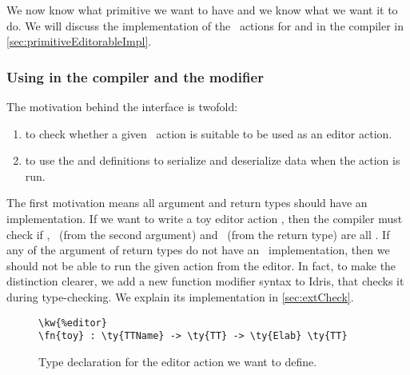 We now know what primitive we want to have and we know what we want it to do.
We will discuss the implementation of the \Elab\ actions for 
and  in the compiler in \autoref{sec:primitiveEditorableImpl}.

\subsubsection{Using  in the compiler and the  modifier}\label{ssec:usingEditorable}

The motivation behind the  interface is twofold:
\begin{enumerate}
\item to check whether a given \Elab\ action is suitable to be used as an
  editor action.
\item to use the  and  definitions to serialize
  and deserialize data when the action is run.
\end{enumerate}


The first motivation means all argument and return types should have an
 implementation. If we want to write a toy editor action
,
then the compiler must check if , \TT\ (from the second argument)
and \TT\ (from the return type) are all \Editorable. If any of the argument of
return types do not have an \Editorable\ implementation, then we should not be
able to run the given action from the editor. In fact, to make the distinction
clearer, we add a new function modifier syntax  to Idris, that
checks it during type-checking.  We explain its implementation in
\autoref{sec:extCheck}.

\begin{figure}[H]
\caption{Type declaration for the  editor action we want to define.}
\begin{Verbatim}[framesep=2mm, label=\footnotesize{\normalfont{Idris}}, labelposition=topline]
\kw{%editor}
\fn{toy} : \ty{TTName} -> \ty{TT} -> \ty{Elab} \ty{TT}
\end{Verbatim}
\end{figure}

